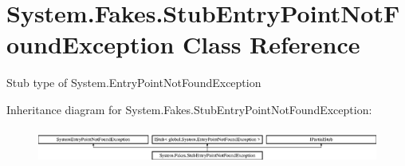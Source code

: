 \hypertarget{class_system_1_1_fakes_1_1_stub_entry_point_not_found_exception}{\section{System.\-Fakes.\-Stub\-Entry\-Point\-Not\-Found\-Exception Class Reference}
\label{class_system_1_1_fakes_1_1_stub_entry_point_not_found_exception}
}


Stub type of System.\-Entry\-Point\-Not\-Found\-Exception 


Inheritance diagram for System.\-Fakes.\-Stub\-Entry\-Point\-Not\-Found\-Exception\-:\begin{figure}[H]
\begin{center}
\leavevmode
\includegraphics[height=1.159420cm]{class_system_1_1_fakes_1_1_stub_entry_point_not_found_exception}
\end{center}
\end{figure}
